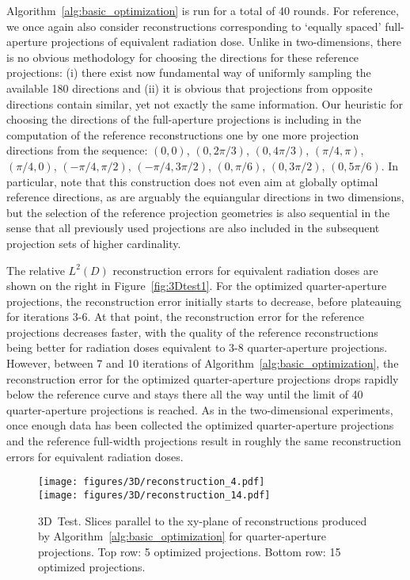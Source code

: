 \documentclass[final]{siamltex}
\begin{document}
Algorithm~\ref{alg:basic_optimization} is run for a total of 40 rounds. For reference, we once again also consider reconstructions corresponding to `equally spaced'
full-aperture projections of equivalent radiation dose. Unlike in two-dimensions, there is no obvious methodology for choosing the directions for these reference projections: (i) there exist now fundamental way of uniformly sampling the available 180 directions and (ii) it is obvious that projections from opposite directions contain similar, yet not exactly the same information. Our heuristic for choosing the directions of the full-aperture projections is including in the computation of the reference reconstructions one by one more projection directions from the sequence: $(0,0)$, $(0, 2\pi/3)$, $(0, 4\pi/3)$, $(\pi/4,\pi)$, $(\pi/4, 0)$, $(-\pi/4, \pi/2)$, $(-\pi/4, 3\pi/2)$, $(0, \pi/6)$, $(0, 3\pi/2)$, $(0, 5\pi/6)$. In particular, note that this construction does not even aim at globally optimal reference directions, as are arguably the equiangular directions in two dimensions, but the selection of the reference projection geometries is also sequential in the sense that all previously used projections are also included in the subsequent projection sets of higher cardinality.

The relative $L^2(D)$ reconstruction errors for equivalent radiation doses are shown on the right in Figure~\ref{fig:3Dtest1}. For the optimized quarter-aperture projections, the reconstruction error initially starts to decrease, before plateauing for iterations 3-6. At that point, the reconstruction error for the reference projections decreases faster, with the quality of the reference reconstructions being better for radiation doses equivalent to 3-8 quarter-aperture projections. However, between 7 and 10 iterations of Algorithm~\ref{alg:basic_optimization}, the reconstruction error for the optimized quarter-aperture projections drops rapidly below the reference curve and stays there all the way until the limit of 40 quarter-aperture projections is reached. As in the two-dimensional experiments, once enough data has been collected the optimized quarter-aperture projections and the reference full-width projections result in roughly the same reconstruction errors for equivalent radiation doses.

\begin{figure}
	\centering
	\texttt{[image: figures/3D/reconstruction\_4.pdf]} \\[4mm]
	\texttt{[image: figures/3D/reconstruction\_14.pdf]}
	\caption{{\sc 3D~Test.} Slices parallel to the xy-plane of reconstructions produced by Algorithm~\ref{alg:basic_optimization} for quarter-aperture projections. Top row: 5 optimized projections. Bottom row: 15 optimized projections.}
	\label{fig:3Dtestrec10_30a}
\end{figure}
\end{document}
